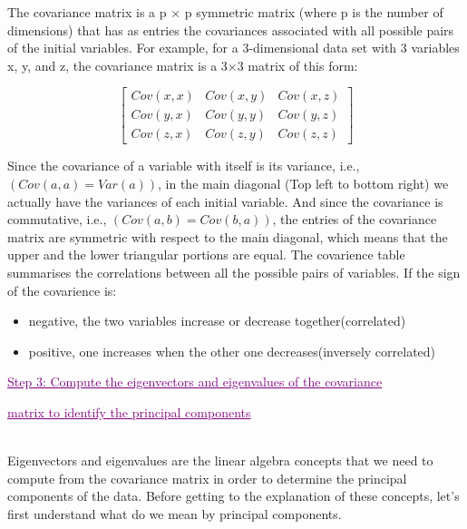 The covariance matrix is a p × p symmetric matrix (where p is the number of dimensions) that has as entries the covariances associated with all possible pairs of the initial variables. For example, for a 3-dimensional data set with 3 variables x, y, and z, the covariance matrix is a 3×3 matrix of this form:
\begin{center}
$$ \begin{bmatrix} Cov(x,x) & Cov(x,y) & Cov(x,z) \\
Cov(y,x) & Cov(y,y) & Cov(y,z) \\
Cov(z,x) & Cov(z,y) & Cov(z,z)
\end{bmatrix} $$
\end{center} 
Since the covariance of a variable with itself is its variance, i.e., \\ ${(Cov(a,a)=Var(a))}$, in the main diagonal (Top left to bottom right) we actually have the variances of each initial variable. And since the covariance is commutative, i.e., ${ (Cov(a,b)=Cov(b,a)) }$, the entries of the covariance matrix are symmetric with respect to the main diagonal, which means that the upper and the lower triangular portions are equal.
The covarience table summarises the correlations between all the possible pairs of variables. If the sign of the covarience is:
\begin{itemize}
    \item negative, the two variables increase or decrease together(correlated)
    \item positive, one increases when the other one decreases(inversely correlated)
\end{itemize}
\newpage
\textcolor{purple}{\underline{Step 3: Compute the eigenvectors and eigenvalues of the covariance}} \\ \textcolor{purple}{\centerline{\underline{{matrix to identify the principal components }}}}\\[0.2 cm]
Eigenvectors and eigenvalues are the linear algebra concepts that we need to compute from the covariance matrix in order to determine the principal components of the data. Before getting to the explanation of these concepts, let’s first understand what do we mean by principal components.

